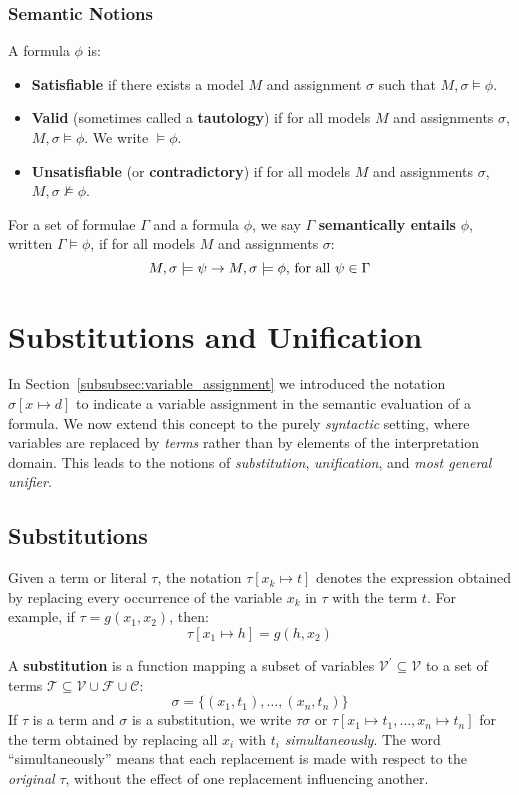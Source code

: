 \subsubsection{Semantic Notions}
A formula \(\phi\) is:
\begin{itemize}
  \item \textbf{Satisfiable} if there exists a model \(M\) and assignment \(\sigma\) such that \(M, \sigma \models \phi\).
  \item \textbf{Valid} (sometimes called a \textbf{tautology}) if for all models \(M\) and assignments \(\sigma\), \(M, \sigma \models \phi\). We write \(\models \phi\).
  \item \textbf{Unsatisfiable} (or \textbf{contradictory}) if for all models \(M\) and assignments \(\sigma\), \(M, \sigma \not\models \phi\).
\end{itemize}

For a set of formulae \(\Gamma\) and a formula \(\phi\), we say \(\Gamma\) \textbf{semantically entails} \(\phi\), written \(\Gamma \models \phi\), if for all models \(M\) and assignments \(\sigma\):
  \[M, \sigma \models \psi \rightarrow M, \sigma \models \phi,\, \text{for all } \psi \in \Gamma\]


\section{Substitutions and Unification}
In Section~\ref{subsubsec:variable_assignment} we introduced the notation \(\sigma[x \mapsto d]\) to indicate a variable assignment in the semantic evaluation of a formula. We now extend this concept to the purely \emph{syntactic} setting, where variables are replaced by \emph{terms} rather than by elements of the interpretation domain. This leads to the notions of \emph{substitution}, \emph{unification}, and \emph{most general unifier}.

\subsection{Substitutions}
Given a term or literal \(\tau\), the notation \(\tau[x_k \mapsto t]\) denotes the expression obtained by replacing every occurrence of the variable \(x_k\) in \(\tau\) with the term \(t\).  
For example, if \(\tau = g(x_1, x_2)\), then:
\begin{equation}
\tau[x_1 \mapsto h] = g(h, x_2)
\end{equation}

A \textbf{substitution} is a function mapping a subset of variables \(\mathcal{V}^{'} \subseteq \mathcal{V}\) to a set of terms \(\mathcal{T} \subseteq \mathcal{V} \cup \mathcal{F} \cup \mathcal{C}\):
\begin{equation}
\sigma = \{ (x_1, t_1), \ldots, (x_n, t_n) \}
\end{equation}
If \(\tau\) is a term and \(\sigma\) is a substitution, we write \(\tau\sigma\) or \(\tau[x_1 \mapsto t_1, \ldots, x_n \mapsto t_n]\) for the term obtained by replacing all \(x_i\) with \(t_i\) \emph{simultaneously}.  
The word “simultaneously” means that each replacement is made with respect to the \emph{original} \(\tau\), without the effect of one replacement influencing another.

